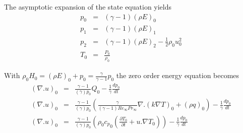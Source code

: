 \documentclass[11pt,a4paper]{article}
\begin{document}
The asymptotic expansion of the state equation yields
\begin{eqnarray}
p_0 &=& (\gamma-1)(\rho E)_0 \\
p_1 &=& (\gamma-1)(\rho E)_1 \\
p_2 &=& (\gamma-1)(\rho E)_2 - \frac{1}{2}\rho_0 u^2_0  \\
T_0 &=& \frac{P_0}{\rho_0}
\end{eqnarray}

With $\rho_0 H_0 = (\rho E)_0 + p_0 = \frac{\gamma}{\gamma-1}p_0$ the zero order energy equation becomes 
\begin{eqnarray}
(\nabla. u)_0 &=& \frac{\gamma - 1}{(\gamma) p_0} Q_0 -\frac{1}{\gamma} \frac{dp_0}{dt} \\
(\nabla. u)_0 &=& \frac{\gamma - 1}{(\gamma) p_0} \left(\frac{\gamma}{(\gamma-1) Re_\infty Pr_\infty} \nabla. (k\nabla T)_0 + (\rho q)_0 \right) -\frac{1}{\gamma} \frac{dp_0}{dt}\\
(\nabla. u)_0 &=& \frac{\gamma - 1}{(\gamma) p_0} \left( \rho_0 {c_p}_0\left(\frac{\partial T_0}{\partial t} + u.\nabla T_0 \right)\right) -\frac{1}{\gamma} \frac{dp_0}{dt}
\end{eqnarray}
\end{document}
